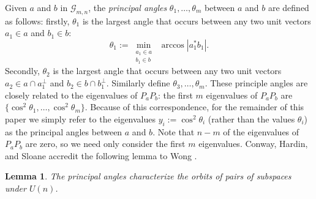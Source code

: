 \documentclass[12pt]{article}
\numberwithin{equation}{section}
\theoremstyle{plainsl}
\newtheorem{lemma}[theorem]{Lemma}
\def\sqr#1#2{{\vbox{\hrule height.#2pt
    \hbox{\vrule width.#2pt height#1pt \kern#1pt
        \vrule width.#2pt}\hrule height.#2pt}}}
\def\eqed{\tag*{\sqr53}}
\def\qed{%
    \ifmmode\eqno\eqed
    \else\nobreak\ \hfill\sqr53\medbreak\fi}
\newcommand\defn[1]{\textsl{#1}}
\renewcommand\th{\theta} %
\newcommand\gras[2]{\mathcal{G}_{#1,#2}}
\newcommand\abs[1]{\left|#1\right|}
\begin{document}
Given $a$ and $b$ in $\gras{m}{n}$, the \defn{principal angles} $\th_1,\ldots,\th_m$ between $a$ and $b$ are defined as follows: firstly, $\th_1$ is the largest angle that occurs between any two unit vectors $a_1 \in a$ and $b_1 \in b$:
\[
\th_1 := \min_{\substack{a_1 \in a\\b_1 \in b}} \; \arccos \abs{a_1^*b_1}.
\]
Secondly, $\th_2$ is the largest angle that occurs between any two unit vectors $a_2 \in a \cap a_1^\perp$ and $b_2 \in b \cap b_1^\perp$. Similarly define $\th_3,\ldots,\th_m$. These principle angles are closely related to the eigenvalues of $P_aP_b$: the first $m$ eigenvalues of $P_aP_b$ are $\{\cos^2 \th_1,\ldots,\cos^2\th_m\}$. Because of this correspondence, for the remainder of this paper we simply refer to the eigenvalues $y_i := \cos^2 \th_i$ (rather than the values $\th_i$) as the principal angles between $a$ and $b$. Note that $n-m$ of the eigenvalues of $P_aP_b$ are zero, so we need only consider the first $m$ eigenvalues. Conway, Hardin, and Sloane \cite{chs} accredit the following lemma to Wong \cite[Theorem 2]{wong}.

\begin{lemma}
The principal angles characterize the orbits of pairs of subspaces under $U(n)$.
\end{lemma}
\end{document}
